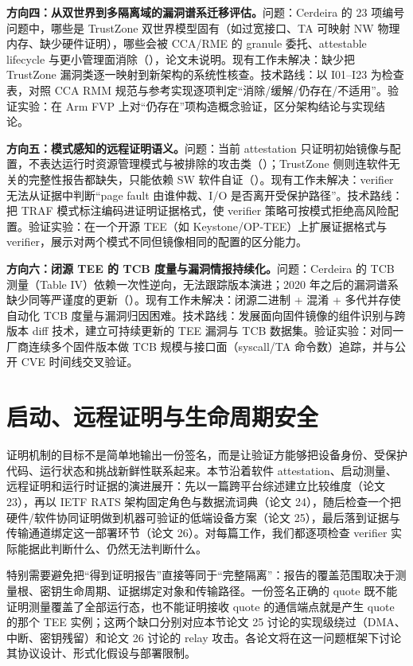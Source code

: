 \documentclass[11pt]{ctexart}
\begin{document}
\noindent\textbf{方向四：从双世界到多隔离域的漏洞谱系迁移评估。}问题：Cerdeira 的 23 项编号问题中，哪些是 TrustZone 双世界模型固有（如过宽接口、TA 可映射 NW 物理内存、缺少硬件证明），哪些会被 CCA/RME 的 granule 委托、attestable lifecycle 与更小管理面消除（\cite{cerdeira2020trustzone,arm_trustzone_whitepaper}），论文未说明。现有工作未解决：缺少把 TrustZone 漏洞类逐一映射到新架构的系统性核查。技术路线：以 I01--I23 为检查表，对照 CCA RMM 规范与参考实现逐项判定``消除/缓解/仍存在/不适用''。验证实验：在 Arm FVP 上对``仍存在''项构造概念验证，区分架构结论与实现结论。\par
\noindent\textbf{方向五：模式感知的远程证明语义。}问题：当前 attestation 只证明初始镜像与配置，不表达运行时资源管理模式与被排除的攻击类（\cite{li2024sokteechoices}）；TrustZone 侧则连软件无关的完整性报告都缺失，只能依赖 SW 软件自证（\cite{cerdeira2020trustzone}）。现有工作未解决：verifier 无法从证据中判断``page fault 由谁仲裁、I/O 是否离开受保护路径''。技术路线：把 TRAF 模式标注编码进证明证据格式，使 verifier 策略可按模式拒绝高风险配置。验证实验：在一个开源 TEE（如 Keystone/OP-TEE）上扩展证据格式与 verifier，展示对两个模式不同但镜像相同的配置的区分能力。\par
\noindent\textbf{方向六：闭源 TEE 的 TCB 度量与漏洞情报持续化。}问题：Cerdeira 的 TCB 测量（Table IV）依赖一次性逆向，无法跟踪版本演进；2020 年之后的漏洞谱系缺少同等严谨度的更新（\cite{cerdeira2020trustzone}）。现有工作未解决：闭源二进制 + 混淆 + 多代并存使自动化 TCB 度量与漏洞归因困难。技术路线：发展面向固件镜像的组件识别与跨版本 diff 技术，建立可持续更新的 TEE 漏洞与 TCB 数据集。验证实验：对同一厂商连续多个固件版本做 TCB 规模与接口面（syscall/TA 命令数）追踪，并与公开 CVE 时间线交叉验证。\par
\section{启动、远程证明与生命周期安全}
证明机制的目标不是简单地输出一份签名，而是让验证方能够把设备身份、受保护代码、运行状态和挑战新鲜性联系起来。本节沿着软件 attestation、启动测量、远程证明和运行时证据的演进展开：先以一篇跨平台综述建立比较维度（论文 23），再以 IETF RATS 架构固定角色与数据流词典（论文 24），随后检查一个把硬件/软件协同证明做到机器可验证的低端设备方案（论文 25），最后落到证据与传输通道绑定这一部署环节（论文 26）。对每篇工作，我们都逐项检查 verifier 实际能据此判断什么、仍然无法判断什么。\par
特别需要避免把“得到证明报告”直接等同于“完整隔离”：报告的覆盖范围取决于测量根、密钥生命周期、证据绑定对象和传输路径。一份签名正确的 quote 既不能证明测量覆盖了全部运行态，也不能证明接收 quote 的通信端点就是产生 quote 的那个 TEE 实例；这两个缺口分别对应本节论文 25 讨论的实现级绕过（DMA、中断、密钥残留）和论文 26 讨论的 relay 攻击。各论文将在这一问题框架下讨论其协议设计、形式化假设与部署限制。\par
\end{document}
